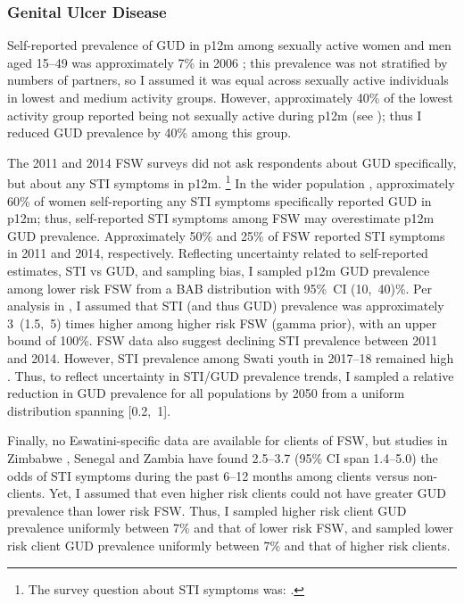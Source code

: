 \subsubsection{Genital Ulcer Disease}\label{model.par.tm.gud}
Self-reported prevalence of GUD in p12m among sexually active women and men aged 15--49
was approximately 7\% in 2006 \cite[Table~13.14]{SDHS2006};
this prevalence was not stratified by numbers of partners, so I assumed it was equal across
sexually active individuals in lowest and medium activity groups.
However, approximately 40\% of the lowest activity group %
reported being not sexually active during p12m \cite{SDHS2006,SHIMS2} (see );
thus I reduced GUD prevalence by 40\% among this group.
\par
The 2011 and 2014 FSW surveys did not ask respondents about GUD specifically,
but about any STI symptoms in p12m.%
\footnote{The survey question about STI symptoms was:
  .}
In the wider population \cite{SDHS2006},
approximately 60\% of women self-reporting any STI symptoms specifically reported GUD in p12m;
thus, self-reported STI symptoms among FSW may overestimate p12m GUD prevalence.
Approximately 50\% and 25\% of FSW reported STI symptoms in 2011 and 2014, respectively.
Reflecting uncertainty related to self-reported estimates, STI vs GUD, and sampling bias,
I sampled p12m GUD prevalence among lower risk FSW from
a BAB distribution with 95\%~CI (10,~40)\%.
Per analysis in , I assumed that STI (and thus GUD) prevalence was
approximately 3~(1.5,~5) times higher among higher risk FSW (gamma prior),
with an upper bound of 100\%.
FSW data also suggest declining STI prevalence between 2011 and 2014.
However, STI prevalence among Swati youth in 2017--18 remained high \cite{Jasumback2020}.
Thus, to reflect uncertainty in STI/GUD prevalence trends,
I sampled a relative reduction in GUD prevalence for all populations by 2050
from a uniform distribution spanning [0.2,~1].
\par
Finally, no Eswatini-specific data are available for clients of FSW,
but studies in Zimbabwe \cite{Cowan2005}, Senegal \cite{Santo2005} and Zambia \cite{Carrasco2020}
have found 2.5--3.7 (95\% CI span 1.4--5.0) the odds
of STI symptoms during the past 6--12 months among clients versus non-clients.
Yet, I assumed that even higher risk clients
could not have greater GUD prevalence than lower risk FSW.
Thus, I sampled higher risk client GUD prevalence uniformly between 7\% and that of lower risk FSW,
and sampled lower risk client GUD prevalence uniformly between 7\% and that of higher risk clients.